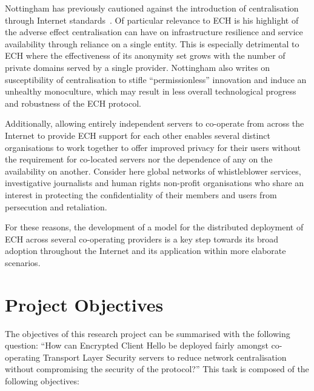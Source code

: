 Nottingham has previously cautioned against the introduction of centralisation through Internet standards~\cite{rfc9518}. Of particular relevance to ECH is his highlight of the adverse effect centralisation can have on infrastructure resilience and service availability through reliance on a single entity. This is especially detrimental to ECH where the effectiveness of its anonymity set grows with the number of private domains served by a single provider. Nottingham also writes on susceptibility of centralisation to stifle ``permissionless'' innovation and induce an unhealthy monoculture, which may result in less overall technological progress and robustness of the ECH protocol.

Additionally, allowing entirely independent servers to co-operate from across the Internet to provide ECH support for each other enables several distinct organisations to work together to offer improved privacy for their users without the requirement for co-located servers nor the dependence of any on the availability on another. Consider here global networks of whistleblower services, investigative journalists and human rights non-profit organisations who share an interest in protecting the confidentiality of their members and users from persecution and retaliation.

For these reasons, the development of a model for the distributed deployment of ECH across several co-operating providers is a key step towards its broad adoption throughout the Internet and its application within more elaborate scenarios.









\section{Project Objectives}

The objectives of this research project can be summarised with the following question: ``How can Encrypted Client Hello be deployed fairly amongst co-operating Transport Layer Security servers to reduce network centralisation without compromising the security of the protocol?'' This task is composed of the following objectives:

